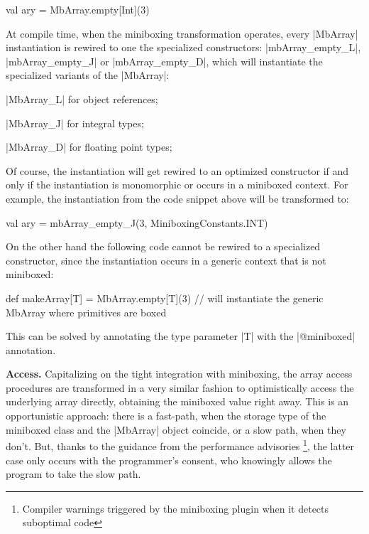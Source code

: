 \begin{lstlisting-nobreak}
val ary = MbArray.empty[Int](3)
\end{lstlisting-nobreak}

At compile time, when the miniboxing transformation operates, every |MbArray| instantiation is rewired to one the specialized constructors: |mbArray_empty_L|, |mbArray_empty_J| or \linebreak|mbArray_empty_D|, which will instantiate the specialized variants of the |MbArray|: 
\begin{compactitem}
  \item |MbArray_L| for object references;
  \item |MbArray_J| for integral types;
  \item |MbArray_D| for floating point types;
\end{compactitem}

Of course, the instantiation will get rewired to an optimized constructor if and only if the instantiation is monomorphic or occurs in a miniboxed context. For example, the instantiation from the code snippet above will be transformed to:

\begin{lstlisting-nobreak}
val ary = mbArray_empty_J(3, MiniboxingConstants.INT)
\end{lstlisting-nobreak}

On the other hand the following code cannot be rewired to a specialized constructor, since the instantiation occurs in a generic context that is not miniboxed:

\begin{lstlisting-nobreak}
def makeArray[T] = MbArray.empty[T](3) // will instantiate the generic MbArray where primitives are boxed
\end{lstlisting-nobreak}

This can be solved by annotating the type parameter |T| with the |@miniboxed| annotation.

\textbf{Access.} Capitalizing on the tight integration with miniboxing, the array access procedures are transformed in a very similar fashion to optimistically access the underlying array directly, obtaining the miniboxed value right away. This is an opportunistic approach: there is a fast-path, when the storage type of the miniboxed class and the |MbArray| object coincide, or a slow path, when they don't. But, thanks to the guidance from the performance advisories \footnote{Compiler warnings triggered by the miniboxing plugin when it detects suboptimal code}, the latter case only occurs with the programmer's consent, who knowingly allows the program to take the slow path.

